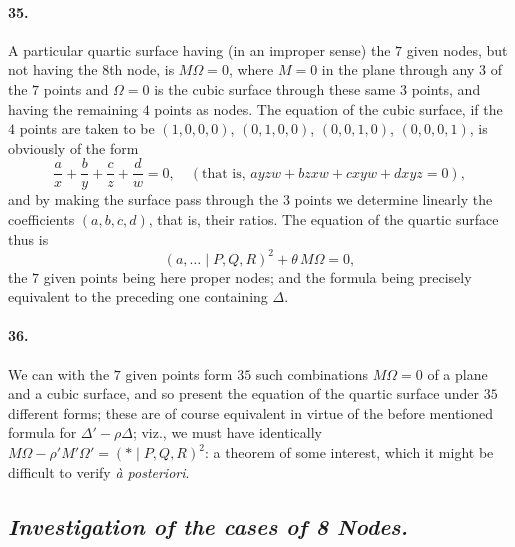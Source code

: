 \documentclass[11pt,a4paper]{article}
\begin{document}
\paragraph{35.}
A particular quartic surface having (in an improper sense) the $7$ given nodes, but not
having the $8$th node, is $M \Omega = 0$, where $M = 0$ in the plane through any $3$ of the
$7$ points and $\Omega = 0$ is the cubic surface through these same $3$ points, and having
the remaining $4$ points as nodes. The equation of the cubic surface, if the $4$ points are
taken to be $(1, 0, 0, 0)$, $(0, 1, 0, 0)$, $(0, 0, 1, 0)$, $(0, 0, 0, 1)$, is obviously of
the form
\[
\frac{a}{x} + \frac{b}{y} + \frac{c}{z} + \frac{d}{w} = 0,\quad (\text{that is, } ayzw + bzxw + cxyw + dxyz = 0),
\]
and by making the surface pass through the $3$ points we determine linearly the coefficients
$(a, b, c, d)$, that is, their ratios. The equation of the quartic surface thus is
\[
(a, \ldots  \mid P, Q, R)^2 + \theta\,M \Omega = 0,
\]
the $7$ given points being here proper nodes; and the formula being precisely equivalent to
the preceding one containing $\Delta$.

\paragraph{36.}
We can with the $7$ given points form $35$ such combinations $M \Omega = 0$ of a plane and
a cubic surface, and so present the equation of the quartic surface under $35$ different
forms; these are of course equivalent in virtue of the before mentioned formula for
$\Delta' - \rho \Delta$; viz., we must have identically $M \Omega - \rho' M' \Omega' = (* \mid P, Q, R)^2$:
a theorem of some interest, which it might be difficult to verify \textit{\`a posteriori}.

\subsection*{\textit{Investigation of the cases of 8 Nodes.}}
\end{document}
